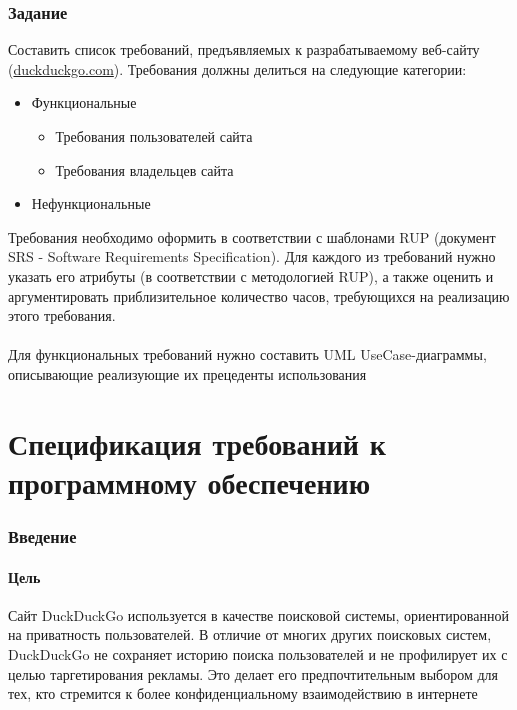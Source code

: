 \documentclass[12pt,a4paper]{article}
\begin{document}
\section{Задание}
Составить список требований, предъявляемых к разрабатываемому веб-сайту (\href{http://duckduckgo.com}{duckduckgo.com}). Требования должны делиться на следующие категории:
\begin{itemize}
    \item Функциональные
    \begin{itemize}
        \item Требования пользователей сайта
        \item Требования владельцев сайта
    \end{itemize}
    \item Нефункциональные
\end{itemize}
Требования необходимо оформить в соответствии с шаблонами RUP (документ SRS - Software Requirements Specification). Для каждого из требований нужно указать его атрибуты (в соответствии с методологией RUP), а также оценить и аргументировать приблизительное количество часов, требующихся на реализацию этого требования. \\
\\
Для функциональных требований нужно составить UML UseCase-диаграммы, описывающие реализующие их прецеденты использования
\part*{Спецификация требований к программному обеспечению}
\section{Введение}
\subsection{Цель}
Сайт DuckDuckGo используется в качестве поисковой системы, ориентированной на приватность пользователей. В отличие от многих других поисковых систем, DuckDuckGo не сохраняет историю поиска пользователей и не профилирует их с целью таргетирования рекламы. Это делает его предпочтительным выбором для тех, кто стремится к более конфиденциальному взаимодействию в интернете
\end{document}
